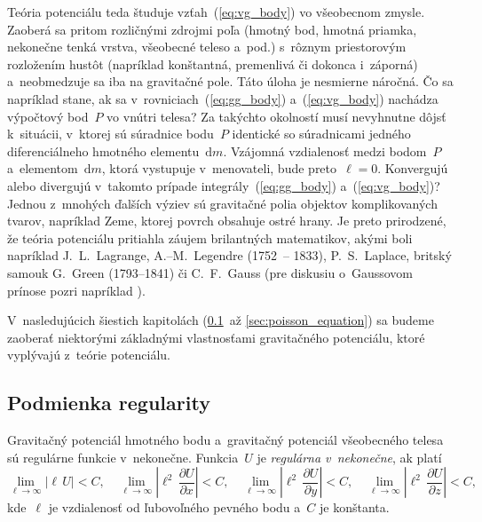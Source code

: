 \documentclass[a4paper, 12pt]{book}
\newcommand{\diff}{\mathrm d}
\begin{document}
Teória potenciálu teda študuje vzťah~(\ref{eq:vg_body}) vo všeobecnom zmysle.  
Zaoberá sa pritom rozličnými zdrojmi poľa (hmotný bod, hmotná priamka, 
nekonečne tenká vrstva, všeobecné teleso a~pod.) s~rôznym priestorovým 
rozložením hustôt (napríklad konštantná, premenlivá či dokonca i~záporná) 
a~neobmedzuje sa iba na gravitačné pole.  Táto úloha je nesmierne náročná.  Čo 
sa napríklad stane, ak sa v~rovniciach~(\ref{eq:gg_body}) a~(\ref{eq:vg_body}) 
nachádza výpočtový bod~$P$ vo vnútri telesa?  Za takýchto okolností musí 
nevyhnutne dôjsť k~situácii, v~ktorej sú súradnice bodu~$P$ identické so 
súradnicami jedného diferenciálneho hmotného elementu~$\diff m$.  Vzájomná 
vzdialenosť medzi bodom~$P$ a~elementom~$\diff m$, ktorá vystupuje 
v~menovateli, bude preto~$\ell = 0$.  Konvergujú alebo divergujú v~takomto 
prípade integrály~(\ref{eq:gg_body}) a~(\ref{eq:vg_body})?  Jednou z~mnohých 
ďalších výziev sú gravitačné polia objektov komplikovaných tvarov, napríklad 
Zeme, ktorej povrch obsahuje ostré hrany.  Je preto prirodzené, že teória 
potenciálu pritiahla záujem brilantných matematikov, akými boli napríklad 
J.~L.~Lagrange, A.--M.~Legendre (1752~-- 1833), P.~S.~Laplace, britský samouk 
G.~Green (1793--1841) či C.~F.~Gauss (pre diskusiu o~Gaussovom prínose pozri 
napríklad \cite{Freeden2018}).

V~nasledujúcich šiestich kapitolách (\ref{sec:regular_function}~až 
\ref{sec:poisson_equation}) sa budeme zaoberať niektorými základnými
vlastnosťami gravitačného potenciálu, ktoré vyplývajú z~teórie potenciálu.






\subsection{Podmienka regularity}
\label{sec:regular_function}

Gravitačný potenciál hmotného bodu a~gravitačný potenciál všeobecného telesa sú 
regulárne funkcie v~nekonečne.  Funkcia~$U$ je \emph{regulárna v~nekonečne}, ak 
platí \parencite{Kellogg1967,Pick1973}
%
\begin{equation}
\label{eq:regular_function}
\lim_{\ell \rightarrow \infty}\left| \ell \, U \right| < C{,} \quad \lim_{\ell 
\rightarrow \infty}\left| \ell^2 \, \frac{\partial U}{\partial x} \right| 
< C{,} \quad \lim_{\ell \rightarrow \infty}\left| \ell^2 \, \frac{\partial 
U}{\partial y} \right| < C{,} \quad \lim_{\ell \rightarrow \infty}\left| \ell^2 
\, \frac{\partial U}{\partial z} \right| < C{,}
\end{equation}
%
kde~$\ell$ je vzdialenosť od ľubovoľného pevného bodu a~$C$ je konštanta.
\end{document}
